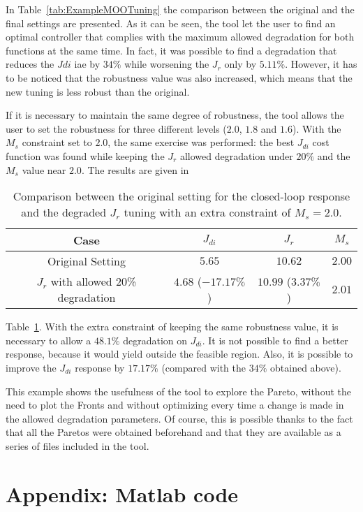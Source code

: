 In Table~\ref{tab:ExampleMOOTuning} the comparison between the original and the final settings are presented. As it can be seen, the tool let the user to find an optimal controller that complies with the maximum allowed degradation for both functions at the same time. In fact, it was possible to find a degradation that reduces the $J{di}$ \gls{iae} by $34\%$ while worsening the $J_r$ only by $5.11\%$. However, it has to be noticed that the robustness value was also increased, which means that the new tuning is less robust than the original.

If it is necessary to maintain the same degree of robustness, the tool allows the user to set the robustness for three different levels ($2.0$, $1.8$ and $1.6$). With the $M_s$ constraint set to $2.0$, the same exercise was performed: the best $J_{di}$ cost function was found while keeping the $J_r$ allowed degradation under $20\%$ and the $M_s$ value near $2.0$. The results are given in %
%
\begin{table}[tb]
	\centering
	\begin{tabular}{cccc}
		\toprule
		Case & $J_{di}$ & $J_{r}$ & $M_s$\\
		\midrule
		Original Setting & $5.65$ & $10.62$ & $2.00$\\
		$J_r$ with allowed 20\% degradation & $4.68$ ($-17.17\%$) & $10.99$ ($3.37\%$) & $2.01$\\
		\bottomrule
	\end{tabular}
	\caption{Comparison between the original setting for the closed-loop response and the degraded $J_r$ tuning with an extra constraint of $M_s = 2.0$.}
	\label{tab:ExampleMOOTuning02}
\end{table}
%
Table~\ref{tab:ExampleMOOTuning02}. With the extra constraint of keeping the same robustness value, it is necessary to allow a $48.1\%$ degradation on $J_{di}$. It is not possible to find a better response, because it would yield outside the feasible region. Also, it is possible to improve the $J_{di}$ response by $17.17\%$ (compared with the $34\%$ obtained above).

This example shows the usefulness of the tool to explore the Pareto, without the need to plot the Fronts and without optimizing every time a change is made in the allowed degradation parameters. Of course, this is possible thanks to the fact that all the Paretos were obtained beforehand and that they are available as a series of files included in the tool.
 
\section{Appendix: Matlab code}
\label{sec:MatlabBode}
